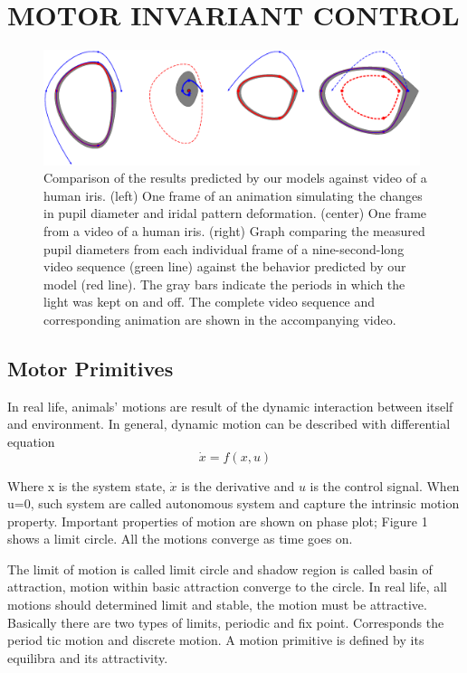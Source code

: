 \section{MOTOR INVARIANT CONTROL}
\begin{figure}[t]
\centerline{\includegraphics[width=11cm]{images/LimitCircle.eps}}
\caption{Comparison of the results predicted by our models against video of a human iris. (left) One frame of an
animation simulating the changes in pupil diameter and iridal pattern deformation. (center) One frame from a video of a
human iris. (right) Graph comparing the measured pupil diameters from each individual frame of a nine-second-long video
sequence (green line) against the behavior predicted by our model (red line). The gray bars indicate the periods in which
the light was kept on and off. The complete video sequence and corresponding animation are shown in the accompanying
video.}    
  \label{fig:videocomparison}
\end{figure}


\subsection{Motor Primitives}
In real life, animals’ motions are result of the dynamic interaction between itself and environment.
In general, dynamic motion can be described with differential equation
\begin{equation}
	\dot{x}=f(x,u)
\end{equation}

Where x is the system state, $\dot{x}$ is the derivative and $u$ is the control signal. 
When u=0, such system are called autonomous system and capture the intrinsic motion property. 
Important properties of motion are shown on phase plot; 
Figure 1 shows a limit circle. 
All the motions converge as time goes on.
\begin{figure}
\end{figure}

The limit of motion is called limit circle and shadow region is called basin of attraction, 
motion within basic attraction converge to the circle.
In real life, all motions should determined limit and stable, the motion must be attractive.
Basically there are two types of limits, periodic and fix point. 
Corresponds the period tic motion and discrete motion.
A motion primitive is defined by its equilibra and its attractivity.

